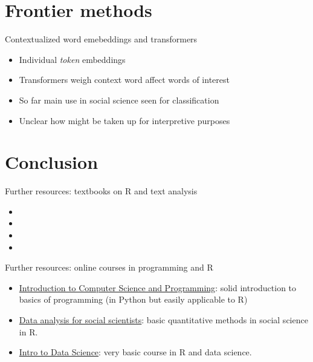 \documentclass[t]{beamer}
\begin{document}
\section{Frontier methods}
\begin{frame}{Contextualized word emebeddings and transformers}
\begin{itemize}
    \item Individual \textit{token} embeddings
    \item Transformers weigh context word affect words of interest
    \item So far main use in social science seen for classification
    \item Unclear how might be taken up for interpretive purposes
\end{itemize}

\end{frame}


\section{Conclusion}
\begin{frame}{Further resources: textbooks on R and text analysis}
    \begin{itemize}
        \item {}
        \item {}
        \item {}
        \item {}
    \end{itemize}
\end{frame}

\begin{frame}{Further resources: online courses in programming and R}
\begin{itemize}
    \item \hyperlink{https://www.edx.org/course/introduction-to-computer-science-and-programming}{Introduction to Computer Science and Programming}: solid introduction to basics of programming (in Python but easily applicable to R)
    \item \hyperlink{https://www.edx.org/course/data-analysis-for-social-scientists}{Data analysis for social scientists}: basic quantitative methods in social science in R.
    \item \hyperlink{https://www.edx.org/professional-certificate/harvardx-data-science}{Intro to Data Science}: very basic course in R and data science.
\end{itemize}
\end{frame}
\end{document}
